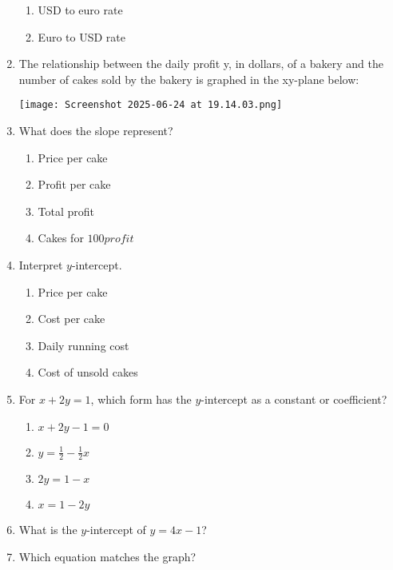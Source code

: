 \documentclass[12pt]{exam}
\begin{document}
\begin{enumerate}
\begin{enumerate}[label=\Alph*)]
        \item USD to euro rate
        \item Euro to USD rate
    \end{enumerate}
    \item The relationship between the daily profit y, in
    dollars, of a bakery and the number of cakes sold
    by the bakery is graphed in the xy-plane below:
    \begin{center}
    \centering
    \texttt{[image: Screenshot 2025-06-24 at 19.14.03.png]}
    \end{center}
    \item What does the slope represent?
    \begin{enumerate}[label=\Alph*)]
        \item Price per cake
        \item Profit per cake
        \item Total profit
        \item Cakes for $100 profit$
    \end{enumerate}
    \item Interpret $y$-intercept.
    \begin{enumerate}[label=\Alph*)]
        \item Price per cake
        \item Cost per cake
        \item Daily running cost
        \item Cost of unsold cakes
    \end{enumerate}
    \item For $x + 2y = 1$, which form has the $y$-intercept as a constant or coefficient?
    \begin{enumerate}[label=\Alph*)]
        \item $x + 2y - 1 = 0$
        \item $y = \frac{1}{2} - \frac{1}{2}x$
        \item $2y = 1 - x$
        \item $x = 1 - 2y$
    \end{enumerate}
    \item What is the $y$-intercept of $y = 4x - 1$?
    \item Which equation matches the graph?
    \begin{center}
\end{center}
\end{enumerate}
\end{document}

